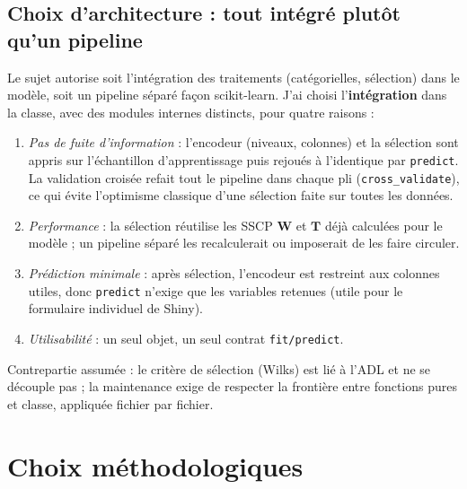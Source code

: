 \documentclass[10.5pt,a4paper]{article}
\newcommand{\code}[1]{\texttt{#1}}
\newcommand{\bm}[1]{\mathbf{#1}}
\begin{document}
\subsection{Choix d'architecture : tout int\'egr\'e plut\^ot qu'un pipeline}
Le sujet autorise soit l'int\'egration des traitements (cat\'egorielles, s\'election) dans le mod\`ele, soit un pipeline s\'epar\'e fa\c{c}on scikit-learn. J'ai choisi l'\textbf{int\'egration} dans la classe, avec des modules internes distincts, pour quatre raisons :
\begin{enumerate}
\item \emph{Pas de fuite d'information} : l'encodeur (niveaux, colonnes) et la s\'election sont appris sur l'\'echantillon d'apprentissage puis rejou\'es \`a l'identique par \code{predict}. La validation crois\'ee refait tout le pipeline dans chaque pli (\code{cross\_validate}), ce qui \'evite l'optimisme classique d'une s\'election faite sur toutes les donn\'ees.
\item \emph{Performance} : la s\'election r\'eutilise les SSCP $\bm W$ et $\bm T$ d\'ej\`a calcul\'ees pour le mod\`ele ; un pipeline s\'epar\'e les recalculerait ou imposerait de les faire circuler.
\item \emph{Pr\'ediction minimale} : apr\`es s\'election, l'encodeur est restreint aux colonnes utiles, donc \code{predict} n'exige que les variables retenues (utile pour le formulaire individuel de Shiny).
\item \emph{Utilisabilit\'e} : un seul objet, un seul contrat \code{fit/predict}.
\end{enumerate}
Contrepartie assum\'ee : le crit\`ere de s\'election (Wilks) est li\'e \`a l'ADL et ne se d\'ecouple pas ; la maintenance exige de respecter la fronti\`ere entre fonctions pures et classe, appliqu\'ee fichier par fichier.

\section{Choix m\'ethodologiques}
\end{document}
